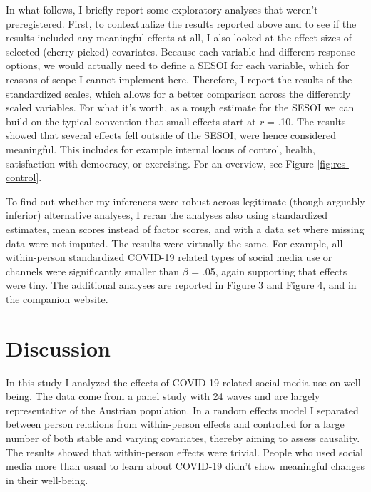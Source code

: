 \documentclass[
  man,mask]{apa6}
\begin{document}
In what follows, I briefly report some exploratory analyses that weren't preregistered.
First, to contextualize the results reported above and to see if the results included any meaningful effects at all, I also looked at the effect sizes of selected (cherry-picked) covariates.
Because each variable had different response options, we would actually need to define a SESOI for each variable, which for reasons of scope I cannot implement here.
Therefore, I report the results of the standardized scales,
which allows for a better comparison across the differently scaled variables.
For what it's worth, as a rough estimate for the SESOI we can build on the typical convention that small effects start at \emph{r} = \textbar.10\textbar.
The results showed that several effects fell outside of the SESOI, were hence considered meaningful.
This includes for example internal locus of control, health, satisfaction with democracy, or exercising.
For an overview, see Figure \ref{fig:res-control}.

To find out whether my inferences were robust across legitimate (though arguably inferior) alternative analyses, I reran the analyses also using standardized estimates, mean scores instead of factor scores, and with a data set where missing data were not imputed.
The results were virtually the same.
For example, all within-person standardized COVID-19 related types of social media use or channels were significantly smaller than \(\beta\) = \textbar.05\textbar, again supporting that effects were tiny.
The additional analyses are reported in Figure 3 and Figure 4, and in the \href{https://XMtRA.github.io/Austrian_Corona_Panel_Project/analyses_additional.html}{companion website}.

\hypertarget{discussion}{%
\section{Discussion}\label{discussion}}

In this study I analyzed the effects of COVID-19 related social media use on well-being.
The data come from a panel study with 24 waves and are largely representative of the Austrian population.
In a random effects model I separated between person relations from within-person effects and controlled for a large number of both stable and varying covariates, thereby aiming to assess causality.
The results showed that within-person effects were trivial.
People who used social media more than usual to learn about COVID-19 didn't show meaningful changes in their well-being.
\end{document}
